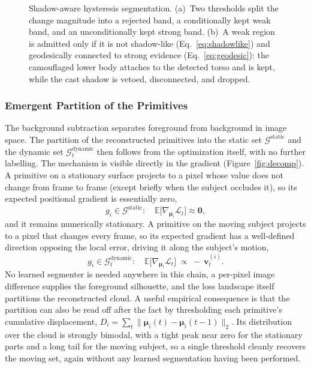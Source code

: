 \begin{figure}[!ht]
    \centering
    \resizebox{0.95\linewidth}{!}{}
    \caption{Shadow-aware hysteresis segmentation. (a)~Two thresholds split the
    change magnitude into a rejected band, a conditionally kept weak band, and an
    unconditionally kept strong band. (b)~A weak region is admitted only if it is not
    shadow-like (Eq.~\eqref{eq:shadowlike}) and geodesically connected to strong
    evidence (Eq.~\eqref{eq:geodesic}): the camouflaged lower body attaches to the
    detected torso and is kept, while the cast shadow is vetoed, disconnected, and
    dropped.}
    \label{fig:hysteresis}
\end{figure}

\subsubsection{Emergent Partition of the Primitives}

The background subtraction separates foreground
from background in image space. The partition of the reconstructed primitives
into the static set $\mathcal{G}^{\text{static}}$ and the dynamic set
$\mathcal{G}^{\text{dynamic}}_t$ then follows from the optimization itself, with no further
labelling. The mechanism is visible directly in the gradient (Figure~\ref{fig:decomp}). A
primitive on a stationary surface projects to a pixel whose value does not change from frame
to frame (except briefly when the subject occludes it), so its expected positional gradient
is essentially zero,
\begin{equation}
    g_i \in \mathcal{G}^{\text{static}}:\quad \mathbb{E}\!\big[\nabla_{\boldsymbol{\mu}_i}\mathcal{L}_t\big] \approx \mathbf{0},
\end{equation}
and it remains numerically stationary. A primitive on the moving subject projects to a
pixel that changes every frame, so its expected gradient has a well-defined direction
opposing the local error, driving it along the subject's motion,
\begin{equation}
    g_i \in \mathcal{G}^{\text{dynamic}}_t:\quad \mathbb{E}\!\big[\nabla_{\boldsymbol{\mu}_i}\mathcal{L}_t\big] \;\propto\; -\,\mathbf{v}^{(i)}_t.
\end{equation}
No learned segmenter is needed anywhere in this chain, a per-pixel image difference
supplies the foreground silhouette, and the loss landscape itself partitions the
reconstructed cloud. A useful empirical consequence is that the partition can also be
read off after the fact by thresholding each primitive's cumulative displacement,
$D_i = \sum_{t} \|\boldsymbol{\mu}_i(t) - \boldsymbol{\mu}_i(t-1)\|_2$. Its distribution
over the cloud is strongly bimodal, with a tight peak near zero for the stationary parts
and a long tail for the moving subject, so a single threshold cleanly recovers the moving
set, again without any learned segmentation having been performed.


